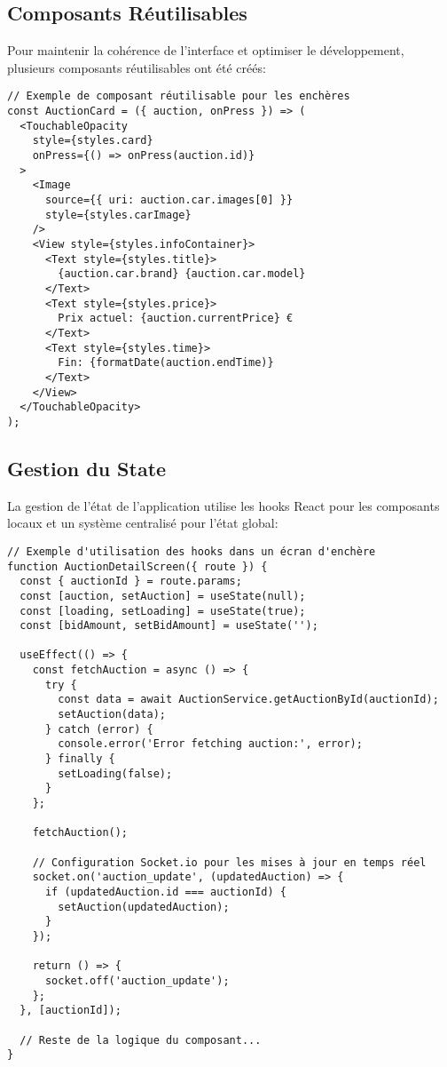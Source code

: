 \subsection{Composants Réutilisables}
Pour maintenir la cohérence de l'interface et optimiser le développement, plusieurs composants réutilisables ont été créés:

\begin{verbatim}
// Exemple de composant réutilisable pour les enchères
const AuctionCard = ({ auction, onPress }) => (
  <TouchableOpacity 
    style={styles.card} 
    onPress={() => onPress(auction.id)}
  >
    <Image
      source={{ uri: auction.car.images[0] }}
      style={styles.carImage}
    />
    <View style={styles.infoContainer}>
      <Text style={styles.title}>
        {auction.car.brand} {auction.car.model}
      </Text>
      <Text style={styles.price}>
        Prix actuel: {auction.currentPrice} €
      </Text>
      <Text style={styles.time}>
        Fin: {formatDate(auction.endTime)}
      </Text>
    </View>
  </TouchableOpacity>
);
\end{verbatim}

\subsection{Gestion du State}
La gestion de l'état de l'application utilise les hooks React pour les composants locaux et un système centralisé pour l'état global:

\begin{verbatim}
// Exemple d'utilisation des hooks dans un écran d'enchère
function AuctionDetailScreen({ route }) {
  const { auctionId } = route.params;
  const [auction, setAuction] = useState(null);
  const [loading, setLoading] = useState(true);
  const [bidAmount, setBidAmount] = useState('');
  
  useEffect(() => {
    const fetchAuction = async () => {
      try {
        const data = await AuctionService.getAuctionById(auctionId);
        setAuction(data);
      } catch (error) {
        console.error('Error fetching auction:', error);
      } finally {
        setLoading(false);
      }
    };
    
    fetchAuction();
    
    // Configuration Socket.io pour les mises à jour en temps réel
    socket.on('auction_update', (updatedAuction) => {
      if (updatedAuction.id === auctionId) {
        setAuction(updatedAuction);
      }
    });
    
    return () => {
      socket.off('auction_update');
    };
  }, [auctionId]);
  
  // Reste de la logique du composant...
}
\end{verbatim}

